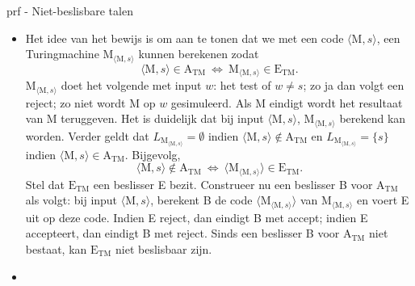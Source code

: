 \begin{prf}{prf - Niet-beslisbare talen}
    \begin{itemize}
        \item 
            Het idee van het bewijs is om aan te tonen dat we met een code $\langle \text{M}, s \rangle$, een Turingmachine $\text{M}_{\langle \text{M}, s \rangle}$ kunnen berekenen zodat 
            \begin{equation*}
                \langle \text{M}, s \rangle \in \text{A}_{\text{TM}} 
                \ \Leftrightarrow \
                \text{M}_{\langle \text{M}, s \rangle} \in \text{E}_{\text{TM}}.
            \end{equation*}
            $\text{M}_{\langle \text{M}, s \rangle}$ doet het volgende met input $w$: het test of $w \neq s$; zo ja dan volgt een reject; zo niet wordt M op $w$ gesimuleerd. Als M eindigt wordt het resultaat van M teruggeven. Het is duidelijk dat bij input $\langle \text{M}, s \rangle$, $\text{M}_{\langle \text{M}, s \rangle}$ berekend kan worden. Verder geldt dat $L_{\text{M}_{\langle \text{M}, s \rangle}} = \emptyset$ indien $\langle \text{M}, s \rangle \notin \text{A}_{\text{TM}}$ en $L_{\text{M}_{\langle \text{M}, s \rangle}} = \{s\}$ indien $\langle \text{M}, s \rangle \in \text{A}_{\text{TM}}$.  Bijgevolg,
            \begin{equation*}
                \langle \text{M}, s \rangle \notin \text{A}_{\text{TM}}
                \ \Leftrightarrow \
                \langle \text{M}_{\langle \text{M}, s \rangle} \rangle \in \text{E}_{\text{TM}}.
            \end{equation*}
            Stel dat $\text{E}_{\text{TM}}$ een beslisser E bezit. Construeer nu een beslisser B voor $\text{A}_{\text{TM}}$ als volgt: bij input $\langle \text{M}, s \rangle$, berekent B de code $\langle \text{M}_{\langle \text{M}, s \rangle} \rangle$ van $\text{M}_{\langle \text{M}, s \rangle}$ en voert E uit op deze code. Indien E reject, dan eindigt B met accept; indien E accepteert, dan eindigt B met reject. Sinds een beslisser B voor $\text{A}_{\text{TM}}$ niet bestaat, kan $\text{E}_{\text{TM}}$ niet beslisbaar zijn.
        \item 

\end{itemize}
\end{prf}
